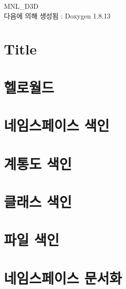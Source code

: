 \documentclass[twoside]{book}
\newcommand{\+}{\discretionary{\mbox{\scriptsize$\hookleftarrow$}}{}{}}
\newcommand{\clearemptydoublepage}{%
  \newpage{\pagestyle{empty}\cleardoublepage}%
}
\begin{document}
\hypersetup{pageanchor=false,
             bookmarksnumbered=true,
             pdfencoding=unicode
            }
\begin{titlepage}
\vspace*{7cm}
\begin{center}%
{\Large M\+N\+L\+\_\+\+D3D }\\
\vspace*{1cm}
{\large 다음에 의해 생성됨 \+:  Doxygen 1.8.13}\\
\end{center}
\end{titlepage}
\clearemptydoublepage
{}
\tableofcontents
\clearemptydoublepage
{}
\hypersetup{pageanchor=true}

\chapter{Title}
\label{index}\hypertarget{index}{}
\chapter{헬로월드}
\label{_xED_x97_xAC_xEB_xA1_x9C_xEC_x9B_x94_xEB_x93_x9C}

\chapter{네임스페이스 색인}

\chapter{계통도 색인}

\chapter{클래스 색인}

\chapter{파일 색인}

\chapter{네임스페이스 문서화}


\end{document}
